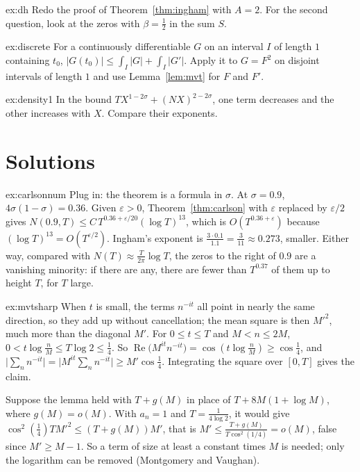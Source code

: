 \begin{hint}{ex:dh}
Redo the proof of Theorem~\ref{thm:ingham} with $A=2$. For the second question, look at the zeros with $\beta=\frac12$ in the sum $S$.
\end{hint}

\begin{hint}{ex:discrete}
For a continuously differentiable $G$ on an interval $I$ of length $1$ containing $t_0$, $|G(t_0)|\le\int_I|G|+\int_I|G'|$. Apply it to $G=F^2$ on disjoint intervals of length $1$ and use Lemma~\ref{lem:mvt} for $F$ and $F'$.
\end{hint}

\begin{hint}{ex:density1}
In the bound $TX^{1-2\sigma}+(NX)^{2-2\sigma}$, one term decreases and the other increases with $X$. Compare their exponents.
\end{hint}

\section{Solutions}

\begin{solution}{ex:carlsonnum}
\idea Plug in: the theorem is a formula in $\sigma$.
\writeup At $\sigma=0.9$, $4\sigma(1-\sigma)=0.36$. Given $\varepsilon>0$, Theorem~\ref{thm:carlson} with $\varepsilon$ replaced by $\varepsilon/2$ gives $N(0.9,T)\le C\,T^{0.36+\varepsilon/20}(\log T)^{13}$, which is $O(T^{0.36+\varepsilon})$ because $(\log T)^{13}=O(T^{\varepsilon/2})$. Ingham's exponent is
$\frac{3\cdot0.1}{1.1}=\frac3{11}\approx0.273$, smaller. Either way, compared with $N(T)\approx\frac T{2\pi}\log T$, the zeros to the right of $0.9$ are a vanishing minority: if there are any, there are fewer than $T^{0.37}$ of them up to height $T$, for $T$ large.
\end{solution}

\begin{solution}{ex:mvtsharp}
\idea When $t$ is small, the terms $n^{-it}$ all point in nearly the same direction, so they add up without cancellation; the mean square is then $M'^2$, much more than the diagonal $M'$.
\writeup For $0\le t\le T$ and $M<n\le2M$, $0<t\log\frac nM\le T\log2\le\frac14$. So $\operatorname{Re}\bigl(M^{it}n^{-it}\bigr)=\cos(t\log\frac nM)\ge\cos\frac14$, and $\bigl|\sum_nn^{-it}\bigr|=\bigl|M^{it}\sum_nn^{-it}\bigr|\ge M'\cos\frac14$. Integrating the square over $[0,T]$ gives the claim.

Suppose the lemma held with $T+g(M)$ in place of $T+8M(1+\log M)$, where $g(M)=o(M)$. With $a_n=1$ and $T=\frac1{4\log2}$, it would give $\cos^2(\frac14)TM'^2\le(T+g(M))M'$, that is $M'\le\frac{T+g(M)}{T\cos^2(1/4)}=o(M)$, false since $M'\ge M-1$. So a term of size at least a constant times $M$ is needed; only the logarithm can be removed (Montgomery and Vaughan).
\end{solution}

